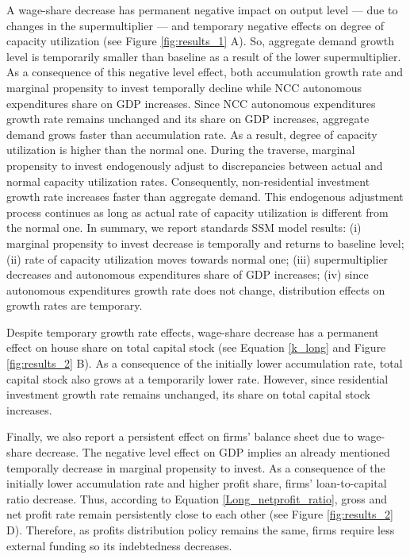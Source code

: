 \documentclass[12pt, a4]{article}
\begin{document}
A wage-share decrease has permanent negative impact on output level --- due to changes in the supermultiplier --- and temporary negative effects on degree of capacity utilization (see Figure \ref{fig:results_1} A).
So, aggregate demand growth level is temporarily smaller than baseline as a result of the lower supermultiplier.
As a consequence of this negative level effect, both accumulation growth rate and marginal propensity to invest temporally decline while NCC autonomous expenditures share on GDP increases.
Since NCC autonomous expenditures growth rate remains unchanged and its share on GDP increases, aggregate demand grows faster than accumulation rate.
As a result, degree of capacity utilization is higher than the normal one.
During the traverse, marginal propensity to invest endogenously adjust to discrepancies between actual and normal capacity utilization rates.
Consequently, non-residential investment growth rate increases faster than aggregate demand.
This endogenous adjustment process continues as long as actual rate of capacity utilization is different from the normal one.
In summary, we report standards SSM model results:
    (i) marginal propensity to invest decrease is temporally and returns to baseline level;
    (ii) rate of capacity utilization moves towards normal one;
    (iii) supermultiplier decreases and autonomous expenditures share of GDP increases;
    (iv) since autonomous expenditures growth rate does not change, distribution effects on growth rates are temporary. 


Despite temporary growth rate effects, wage-share decrease has a permanent effect on house share on total capital stock (see Equation \ref{k_long} and Figure \ref{fig:results_2} B).
As a consequence of the initially lower accumulation rate, total capital stock also grows at a temporarily lower rate.
However, since residential investment growth rate remains unchanged, its share on total capital stock increases.

Finally, we also report a persistent effect on firms' balance sheet due to wage-share decrease.
The negative level effect on GDP implies an already mentioned temporally decrease in marginal propensity to invest.
As a consequence of the initially lower accumulation rate and higher profit share, firms' loan-to-capital ratio decrease.
Thus, according to Equation \ref{Long_netprofit_ratio}, gross and net profit rate remain persistently close to each other (see Figure \ref{fig:results_2} D).
Therefore, as profits distribution policy remains the same, firms require less external funding so its indebtedness decreases.
\end{document}
